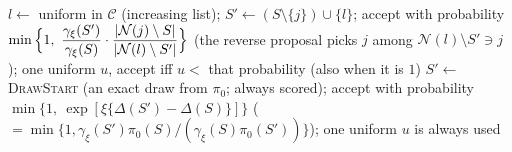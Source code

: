\begin{algorithm}
{\begin{algorithmic}[1]
\State $l\gets$ uniform in $\mathcal C$ (increasing list); $S'\gets(S\setminus\{j\})\cup\{l\}$; accept with probability $\min\Big\{1,\ \dfrac{\gamma_\xi(S')}{\gamma_\xi(S)}\cdot\dfrac{\abs{\mathcal N(j)\setminus S}}{\abs{\mathcal N(l)\setminus S'}}\Big\}$ (the reverse proposal picks $j$ among $\mathcal N(l)\setminus S'\ni j$); one uniform $u$, accept iff $u<$ that probability (also when it is $1$) %
\EndProcedure
{}
\State $S'\gets$ \textsc{DrawStart} (an exact draw from $\pi_0$; always scored); accept with probability $\min\{1,\ \exp[\xi\{\Delta(S')-\Delta(S)\}]\}$ ($=\min\{1,\gamma_\xi(S')\pi_0(S)/(\gamma_\xi(S)\pi_0(S'))\}$); one uniform $u$ is always used %
\EndProcedure
\end{algorithmic}}
\end{algorithm}

